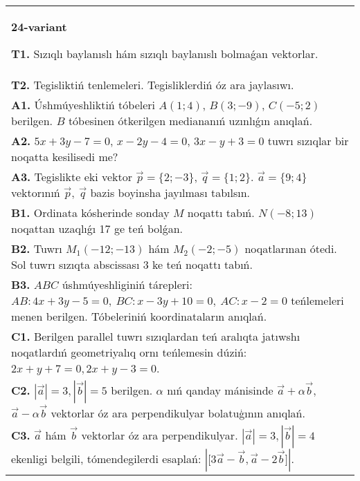 \documentclass{article}
\begin{document}
\begin{tabular}{m{17cm}}
\textbf{24-variant}

\textbf{T1.} 
Sızıqlı baylanıslı hám sızıqlı baylanıslı bolmaǵan vektorlar.
 \\
\textbf{T2.} 
Tegisliktiń tenlemeleri. Tegisliklerdiń óz ara jaylasıwı.
 \\
\textbf{A1.} 
Úshmúyeshliktiń tóbeleri $A (1;4) $, $B (3;-9) $, $C (-5;2) $
berilgen. $B$ tóbesinen ótkerilgen mediananıń uzınlıǵın anıqlań.
 \\
\textbf{A2.} 
$5x+3y-7=0$, $x-2y-4=0$, $3x-y+3=0$
tuwrı sızıqlar bir noqatta kesilisedi me?
 \\
\textbf{A3.} 
Tegislikte eki vektor
$\overrightarrow{p} = \{ 2; - 3\}$, $\overrightarrow{q} = \{ 1;2\}$.
$\overrightarrow{a} = \{9;4\}$ vektorınıń
$\overrightarrow{p},\ \overrightarrow{q}$ bazis boyinsha jayılması tabılsın.
 \\
\textbf{B1.} 
Ordinata kósherinde sonday $M$ noqattı tabıń.
\(N (-8;13) \) noqattan uzaqlıǵı 17 ge teń bolǵan.
 \\
\textbf{B2.} 
Tuwrı \(M_{1} (-12;-13) \) hám \(M_{2} (-2;-5) \)
noqatlarınan ótedi. Sol tuwrı sızıqta abscissası 3 ke teń noqattı tabıń.
 \\
\textbf{B3.} 
$ABC$ úshmúyeshliginiń tárepleri:
\(AB:4x+3y-5=0,\ BC:x-3y+10=0,\ AC:x-2=0\)
teńlemeleri menen berilgen. Tóbeleriniń koordinataların anıqlań.
 \\
\textbf{C1.} 
Berilgen parallel tuwrı sızıqlardan teń aralıqta jatıwshı
noqatlardıń geometriyalıq ornı teńlemesin dúziń: $2x+y+7=0, 2x+y-3=0$.
 \\
\textbf{C2.} 
$|\vec{a}| = 3,|\vec{b}| = 5$ berilgen. $\alpha$ nıń qanday mánisinde $\vec{a} + \alpha\vec{b}$, $\vec{a} - \alpha\vec{b}$ vektorlar óz ara perpendikulyar bolatuģının anıqlań.
 \\
\textbf{C3.} 
$\vec{a}$ hám $\vec{b}$ vektorlar óz ara perpendikulyar. $|\vec{a}| = 3,|\vec{b}| = 4$ ekenligi belgili, tómendegilerdi esaplań:
$|\lbrack 3\vec{a} - \vec{b},\vec{a}-2\vec{b}\rbrack|$.
 \\

\end{tabular}
\vspace{1cm}
\end{document}
